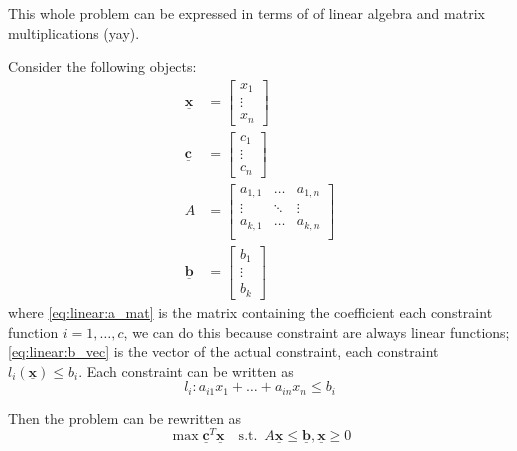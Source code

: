 \documentclass[14pt]{extarticle}
\renewcommand{\vec}[1]{\underline{\mathbf{#1}}}
\begin{document}
This whole problem can be expressed in terms of of linear algebra and matrix multiplications (yay).

Consider the following objects:
\begin{align}
    \vec x & = \begin{bmatrix}
                   x_1    \\
                   \vdots \\
                   x_n
               \end{bmatrix}                        \\
    \vec c & = \begin{bmatrix}
                   c_1    \\
                   \vdots \\
                   c_n
               \end{bmatrix}                        \\
    A      & = \begin{bmatrix}
                   a_{1,1} & \dots  & a_{1, n} \\
                   \vdots  & \ddots & \vdots   \\
                   a_{k,1} & \dots  & a_{k, n} \\
               \end{bmatrix} \label{eq:linear:a_mat} \\
    \vec b & = \begin{bmatrix}
                   b_1    \\
                   \vdots \\
                   b_k
               \end{bmatrix} \label{eq:linear:b_vec}
\end{align}
where \autoref{eq:linear:a_mat} is the matrix containing the coefficient each constraint function $i = 1, \ldots, c$, we can do this because constraint are always linear functions;
\autoref{eq:linear:b_vec} is the vector of the actual constraint, each constraint $l_i(\vec{x}) \leq b_i$.
Each constraint can be written as
\begin{equation}
    \label{eq:linear:constraint}
    l_i: a_{i1} x_1 + \dots + a_{in} x_n \leq b_i
\end{equation}

Then the problem can be rewritten as
\begin{equation}
    \max \vec c^T \vec x \quad \text{s.t.} \enspace A \vec x \leq \vec b, \vec x \geq 0
\end{equation}
\end{document}
